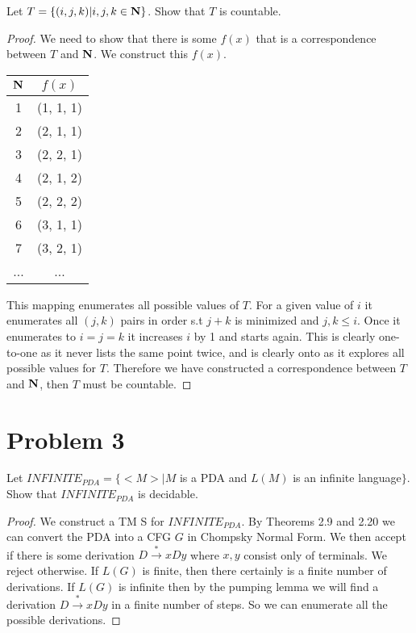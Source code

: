 \documentclass[11pt]{article}
\begin{document}
Let $T=\{(i,j,k)|i,j,k\in{\mathbf{N}}\}$. Show that $T$ is countable.


\begin{proof}


We need to show that there is some $f(x)$ that is a correspondence between $T$ and $\mathbf{N}$.  We construct this $f(x)$. 

\begin{table}[H]
\centering
	\begin{tabular}{c | c}
	$\mathbf{N}$ & $f(x)$\\ \hline
	1 & (1, 1, 1)\\
	2 & (2, 1, 1)\\
	3 & (2, 2, 1)\\
	4 & (2, 1, 2)\\
	5 & (2, 2, 2)\\
	6 & (3, 1, 1)\\
	7 & (3, 2, 1)\\
	... & ...
	\end{tabular}
\end{table}

This mapping enumerates all possible values of $T$. For a given value of $i$ it enumerates all $(j, k)$ pairs in order s.t $j+k$ is minimized and $j, k \leq i$. Once it enumerates to $i = j = k$ it increases $i$ by 1 and starts again. This is clearly one-to-one as it never lists the same point twice, and is clearly onto as it explores all possible values for $T$. Therefore we have constructed a correspondence between $T$ and $\mathbf{N}$, then $T$ must be countable.

\end{proof}


\newpage
\section*{Problem 3}

Let $INFINITE_{PDA}=\{<M>|M$ is a PDA and $L(M)$ is an infinite language$\}$.
Show that $INFINITE_{PDA}$ is decidable.
\newline




\begin{proof}

We construct a TM S for $INFINITE_{PDA}$. By Theorems 2.9 and 2.20 we can convert the PDA into a CFG $G$ in Chompsky Normal Form. We then accept if there is some derivation $D \xrightarrow{*} xDy$ where $x,y$ consist only of terminals. We reject otherwise. If $L(G)$ is finite, then there certainly is a finite number of derivations. If $L(G)$ is infinite then by the pumping lemma we will find a derivation $D \xrightarrow{*} xDy$ in a finite number of steps. So we can enumerate all the possible derivations.

\end{proof}
\end{document}
